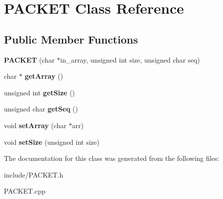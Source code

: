 \hypertarget{classPACKET}{}\section{P\+A\+C\+K\+E\+T Class Reference}
\label{classPACKET}
\subsection*{Public Member Functions}
\begin{DoxyCompactItemize}
\item 
\hypertarget{classPACKET_a85db1c47f3f84b9950163c250f5736b3}{}{\bfseries P\+A\+C\+K\+E\+T} (char $\ast$in\+\_\+array, unsigned int size, unsigned char seq)\label{classPACKET_a85db1c47f3f84b9950163c250f5736b3}

\item 
\hypertarget{classPACKET_a291b51f3c7bcade7fa3029c9d3a5efbe}{}char $\ast$ {\bfseries get\+Array} ()\label{classPACKET_a291b51f3c7bcade7fa3029c9d3a5efbe}

\item 
\hypertarget{classPACKET_ab198b52f5ff4cfd7108dbe7a2e90a8f6}{}unsigned int {\bfseries get\+Size} ()\label{classPACKET_ab198b52f5ff4cfd7108dbe7a2e90a8f6}

\item 
\hypertarget{classPACKET_a2a7cdcb17df7cf81de4f047327dfb385}{}unsigned char {\bfseries get\+Seq} ()\label{classPACKET_a2a7cdcb17df7cf81de4f047327dfb385}

\item 
\hypertarget{classPACKET_ae15559d044169fe79f0f420de8503a1f}{}void {\bfseries set\+Array} (char $\ast$arr)\label{classPACKET_ae15559d044169fe79f0f420de8503a1f}

\item 
\hypertarget{classPACKET_a037feea9c09f52f6fd4ac31faa7d0540}{}void {\bfseries set\+Size} (unsigned int size)\label{classPACKET_a037feea9c09f52f6fd4ac31faa7d0540}

\end{DoxyCompactItemize}


The documentation for this class was generated from the following files\+:\begin{DoxyCompactItemize}
\item 
include/P\+A\+C\+K\+E\+T.\+h\item 
P\+A\+C\+K\+E\+T.\+cpp\end{DoxyCompactItemize}
